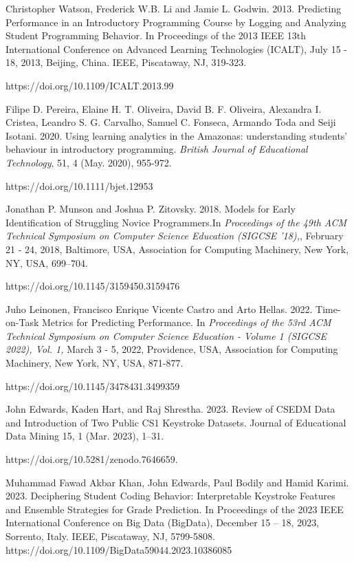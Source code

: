 \documentclass[sigconf,final]{acmart}
\begin{document}

\begin{thebibliography}{99}

Christopher Watson, Frederick W.B. Li and Jamie L. Godwin. 2013. Predicting Performance in an Introductory Programming Course by Logging and Analyzing Student Programming Behavior. In Proceedings of the 2013 IEEE 13th International Conference on Advanced Learning Technologies (ICALT), July 15 - 18, 2013, Beijing, China. IEEE, Piscataway, NJ, 319-323. 

{https://doi.org/10.1109/ICALT.2013.99}

Filipe D. Pereira, Elaine H. T. Oliveira, David B. F. Oliveira, Alexandra I. Cristea, Leandro S. G. Carvalho, Samuel C. Fonseca, Armando Toda and Seiji Isotani. 2020. Using learning analytics in the Amazonas: understanding students’ behaviour in introductory programming.  \textit{ British Journal of Educational Technology}, 51, 4 (May. 2020), 955-972.

{https://doi.org/10.1111/bjet.12953}

Jonathan P. Munson and Joshua P. Zitovsky. 2018. Models for Early Identification of Struggling Novice Programmers.In \textit{Proceedings of the 49th ACM Technical Symposium on Computer Science Education (SIGCSE '18),}, February 21 - 24, 2018, Baltimore, USA, Association for Computing Machinery, New York, NY, USA, 699–704. 

{https://doi.org/10.1145/3159450.3159476}

Juho Leinonen, Francisco Enrique Vicente Castro and Arto Hellas. 2022. Time-on-Task Metrics for Predicting Performance. In \textit{Proceedings of the 53rd ACM Technical Symposium on Computer Science Education - Volume 1 (SIGCSE 2022), Vol. 1,} March 3 - 5, 2022, Providence, USA, Association for Computing Machinery, New York, NY, USA, 871-877.

{https://doi.org/10.1145/3478431.3499359}

John Edwards, Kaden Hart, and Raj Shrestha. 2023. Review of CSEDM Data and Introduction of Two Public CS1 Keystroke Datasets. Journal of Educational Data Mining 15, 1 (Mar. 2023), 1–31.

{ https://doi.org/10.5281/zenodo.7646659.}

Muhammad Fawad Akbar Khan, John Edwards, Paul Bodily and Hamid Karimi. 2023. Deciphering Student Coding Behavior: Interpretable Keystroke Features and Ensemble Strategies for Grade Prediction. In Proceedings of the 2023 IEEE International Conference on Big Data (BigData), December 15 – 18, 2023, Sorrento, Italy. IEEE, Piscataway, NJ, 5799-5808. 
{https://doi.org/10.1109/BigData59044.2023.10386085}


\end{thebibliography}
\end{document}
